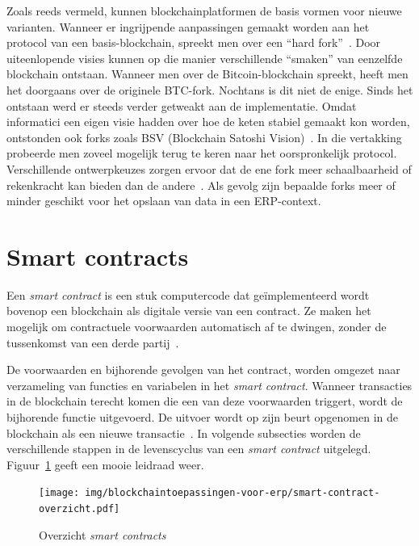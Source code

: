 Zoals reeds vermeld, kunnen blockchainplatformen de basis vormen voor nieuwe varianten. Wanneer er ingrijpende aanpassingen gemaakt worden aan het protocol van een basis-blockchain, spreekt men over een ``hard fork''~\autocite{Swan2015}. Door uiteenlopende visies kunnen op die manier verschillende ``smaken'' van eenzelfde blockchain ontstaan. Wanneer men over de Bitcoin-blockchain spreekt, heeft men het doorgaans over de originele BTC-fork. Nochtans is dit niet de enige. Sinds het ontstaan werd er steeds verder getweakt aan de implementatie. Omdat informatici een eigen visie hadden over hoe de keten stabiel gemaakt kon worden, ontstonden ook forks zoals BSV (Blockchain Satoshi Vision)~\autocite{Huber2020}. In die vertakking probeerde men zoveel mogelijk terug te keren naar het oorspronkelijk protocol. Verschillende ontwerpkeuzes zorgen ervoor dat de ene fork meer schaalbaarheid of rekenkracht kan bieden dan de andere~\autocite{MNP2021}. Als gevolg zijn bepaalde forks meer of minder geschikt voor het opslaan van data in een ERP-context.

\section{Smart contracts}
\label{sec:smart-contracts}

Een \textit{smart contract} is een stuk computercode dat geïmplementeerd wordt bovenop een blockchain als digitale versie van een contract. Ze maken het mogelijk om contractuele voorwaarden automatisch af te dwingen, zonder de tussenkomst van een derde partij~\autocite{Salem2008}.

De voorwaarden en bijhorende gevolgen van het contract, worden omgezet naar verzameling van functies en variabelen in het \textit{smart contract}. Wanneer transacties in de blockchain terecht komen die een van deze voorwaarden triggert, wordt de bijhorende functie uitgevoerd. De uitvoer wordt op zijn beurt opgenomen in de blockchain als een nieuwe transactie~\autocite{Zheng2019}. In volgende subsecties worden de verschillende stappen in de levenscyclus van een \textit{smart contract} uitgelegd. Figuur~\ref{fig:smart-contracts-overview} geeft een mooie leidraad weer.

\begin{figure}[]
	\centering
	\texttt{[image: img/blockchaintoepassingen-voor-erp/smart-contract-overzicht.pdf]}
	\caption{\label{fig:smart-contracts-overview}Overzicht \textit{smart contracts}~\autocite{Zheng2019}}
\end{figure}

